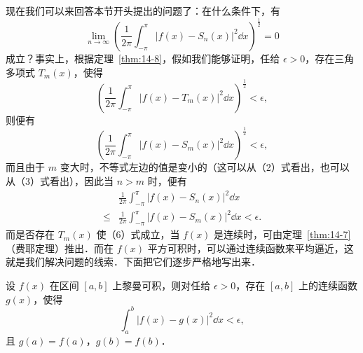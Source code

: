 现在我们可以来回答本节开头提出的问题了：在什么条件下，有
\[
\lim_{n\to\infty}\left(\frac{1}{2\pi}\int_{-\pi}^{\pi}\left|f(x)-S_{n}(x)\right|^{2}\dd x\right)^{\frac{1}{2}}=0
\]
成立？事实上，根据定理~\ref{thm:14-8}，假如我们能够证明，任给 $\epsilon>0$，存在三角多项式 $T_{m}(x)$，使得
\begin{equation}
\left(\frac{1}{2\pi}\int_{-\pi}^{\pi}\left|f(x)-T_{m}(x)\right|^{2}\dd x\right)^{\frac{1}{2}}<\epsilon,
\tag{6}
\end{equation}
则便有
\[
\left(\frac{1}{2\pi}\int_{-\pi}^{\pi}\left|f(x)-S_{m}(x)\right|^{2}\dd x\right)^{\frac{1}{2}}<\epsilon,
\]
而且由于 $m$ 变大时，不等式左边的值是变小的（这可以从（2）式看出，也可以从（3）式看出），因此当 $n>m$ 时，便有
\[
\begin{aligned}
&\frac{1}{2\pi}\int_{-\pi}^{\pi}\left|f(x)-S_{n}(x)\right|^{2}\dd x\\
\leqslant{}&\frac{1}{2\pi}\int_{-\pi}^{\pi}\left|f(x)-S_{m}(x)\right|^{2}\dd x<\epsilon.
\end{aligned}
\]
而是否存在 $T_{m}(x)$ 使（6）式成立，当 $f(x)$ 是连续时，可由定理~\ref{thm:14-7}（费耶定理）推出．而在 $f(x)$ 平方可积时，可以通过连续函数来平均逼近，这就是我们解决问题的线索．下面把它们逐步严格地写出来．

\begin{lemma}\label{lem:14-4-1}
设 $f(x)$ 在区间 $[a,b]$ 上黎曼可积，则对任给 $\epsilon>0$，存在 $[a,b]$ 上的连续函数 $g(x)$，使得
\[
\int_{a}^{b}\left|f(x)-g(x)\right|^{2}\dd x<\epsilon,
\]
且 $g(a)=f(a)$，$g(b)=f(b)$．
\end{lemma}

